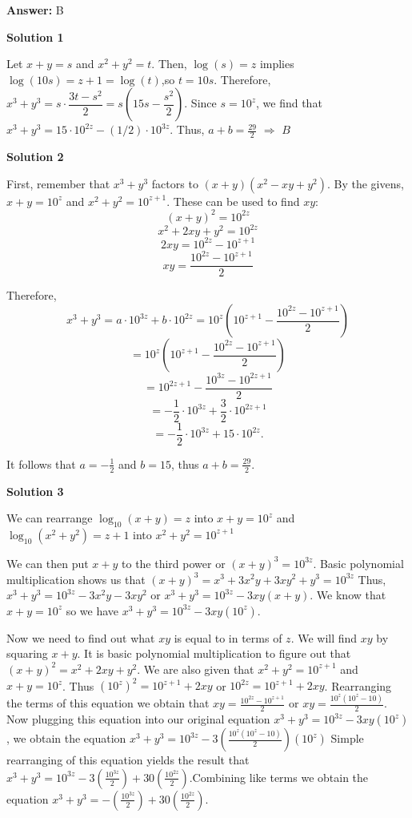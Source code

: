 \begin{enumerate}
 \textbf{Answer: }B



\textbf{Solution 1}

Let $x + y = s$ and $x^2 + y^2 = t$.   Then, $\log(s)=z$ implies $\log(10s) = z+1= \log(t)$,so $t=10s$.   Therefore, $x^3 + y^3 = s\cdot\dfrac{3t-s^2}{2} = s(15s-\dfrac{s^2}{2})$.  Since $s = 10^z$, we find that $x^3 + y^3 = 15\cdot10^{2z} - (1/2)\cdot10^{3z}$.  Thus, $a+b = \frac{29}{2}$ $\Rightarrow$ $\boxed{B}$




\textbf{Solution 2}

First, remember that $x^3 + y^3$ factors to $(x + y) (x^2 - xy + y^2)$. By the givens, $x + y = 10^z$ and $x^2 + y^2 = 10^{z + 1}$. These can be used to find $xy$:
 \[(x + y)^2 = 10^{2z}\]
 \[x^2 + 2xy + y^2 = 10^{2z}\]
 \[2xy = 10^{2z} - 10^{z + 1}\]
 \[xy = \frac{10^{2z} - 10^{z + 1}}{2}\]

 Therefore,
 \[x^3 + y^3 = a \cdot 10^{3z} + b \cdot 10^{2z} = 10^z\left(10^{z + 1} - \frac{10^{2z} - 10^{z + 1}}{2}\right)\]
 \[= 10^z\left(10^{z + 1} - \frac{10^{2z} - 10^{z + 1}}{2}\right)\]
 \[= 10^{2z + 1} - \frac{10^{3z} - 10^{2z + 1}}{2}\]
 \[= -\frac{1}{2} \cdot 10^{3z} + \frac{3}{2} \cdot 10^{2z + 1}\]
 \[= -\frac{1}{2} \cdot 10^{3z} + 15 \cdot 10^{2z}.\]

 It follows that $a = -\frac{1}{2}$ and $b = 15$, thus $a + b = \frac{29}{2}.$




\textbf{Solution 3}

We can rearrange $\log_{10}(x+y)=z$ into $x+y=10^{z}$ and $\log_{10}(x^2+y^2)=z+1$ into $x^2+y^2=10^{z+1}$

 We can then put $x+y$ to the third power or $(x+y)^{3}=10^{3z}$. Basic polynomial multiplication shows us that $(x+y)^{3}=x^3+3x^{2}y+3xy^{2}+y^3=10^{3z}$ Thus, $x^3+y^3=10^{3z}-3x^{2}y-3xy^{2}$ or  $x^3+y^3=10^{3z}-3xy(x+y)$. We know that $x+y=10^{z}$ so we have $x^3+y^3=10^{3z}-3xy(10^{z})$.

 Now we need to find out what $xy$ is equal to in terms of $z$. We will find $xy$ by squaring $x+y$. It is basic polynomial multiplication to figure out that $(x+y)^{2}=x^2+2xy+y^2$. We are also given that $x^2+y^2=10^{z+1}$ and $x+y=10^{z}$. Thus $(10^{z})^{2}=10^{z+1}+2xy$ or $10^{2z}=10^{z+1}+2xy$. Rearranging the terms of this equation we obtain that $xy=\frac{10^{2z}-10^{z+1}}{2}$ or $xy=\frac{10^z(10^z-10)}{2}$. Now plugging this equation into our original equation  $x^3+y^3=10^{3z}-3xy(10^{z})$, we obtain the equation $x^3+y^3=10^{3z}-3(\frac{10^z(10^z-10)}{2})(10^{z})$ Simple rearranging of this equation yields the result that $x^3+y^3=10^{3z}-3(\frac{10^{3z}}{2})+30(\frac{10^{2z}}{2})$.Combining like terms we obtain the equation $x^3+y^3= -(\frac{10^{3z}}{2})+30(\frac{10^{2z}}{2})$.


\end{enumerate}

